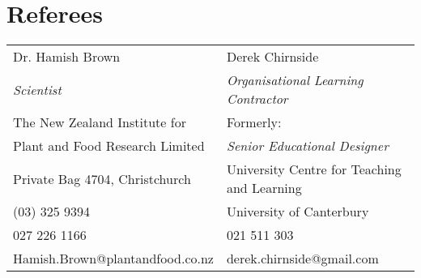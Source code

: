 \documentclass[10pt]{article}
\begin{document}
    \section*{Referees}
        \begin{tabularx}{\textwidth}{XX}
            Dr. Hamish Brown                & Derek Chirnside                                    \\
            \emph{Scientist}                & \emph{Organisational Learning Contractor}          \\
            The New Zealand Institute for   & Formerly:                                          \\
            Plant and Food Research Limited & \qquad \emph{Senior Educational Designer}          \\
            Private Bag 4704, Christchurch  & \qquad University Centre for Teaching and Learning \\
            (03) 325 9394                   & \qquad University of Canterbury                    \\
            027 226 1166                    & 021 511 303                                        \\
            Hamish.Brown@plantandfood.co.nz & derek.chirnside@gmail.com                          \\
        \end{tabularx}
\end{document}

